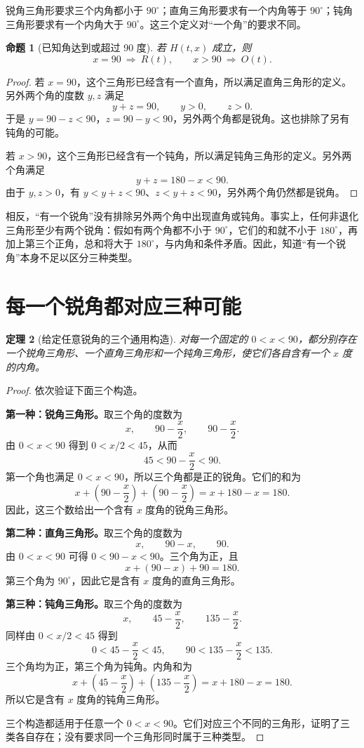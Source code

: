 \documentclass[UTF8,a4paper,zihao=-4,oneside,openany,fontset=fandol]{ctexbook}
\newtheorem{theorem}{定理}[chapter]
\newtheorem{proposition}[theorem]{命题}
\theoremstyle{definition}
\theoremstyle{remark}
\begin{document}
锐角三角形要求三个内角都小于 $90^\circ$；直角三角形要求有一个内角等于 $90^\circ$；钝角三角形要求有一个内角大于 $90^\circ$。这三个定义对“一个角”的要求不同。

\begin{proposition}[已知角达到或超过 90 度]
\label{prop:any-angle-large}
若 $H(t,x)$ 成立，则
\[
x=90\ \Longrightarrow\ R(t),
\qquad
x>90\ \Longrightarrow\ O(t).
\]
\end{proposition}

\begin{proof}
若 $x=90$，这个三角形已经含有一个直角，所以满足直角三角形的定义。另外两个角的度数 $y,z$ 满足
\[
y+z=90,\qquad y>0,\qquad z>0.
\]
于是 $y=90-z<90$，$z=90-y<90$，另外两个角都是锐角。这也排除了另有钝角的可能。

若 $x>90$，这个三角形已经含有一个钝角，所以满足钝角三角形的定义。另外两个角满足
\[
y+z=180-x<90.
\]
由于 $y,z>0$，有 $y<y+z<90$、$z<y+z<90$，另外两个角仍然都是锐角。
\end{proof}

相反，“有一个锐角”没有排除另外两个角中出现直角或钝角。事实上，任何非退化三角形至少有两个锐角：假如有两个角都不小于 $90^\circ$，它们的和就不小于 $180^\circ$，再加上第三个正角，总和将大于 $180^\circ$，与内角和条件矛盾。因此，知道“有一个锐角”本身不足以区分三种类型。

\section{每一个锐角都对应三种可能}

\begin{theorem}[给定任意锐角的三个通用构造]
\label{thm:any-acute-three-types}
对每一个固定的 $0<x<90$，都分别存在一个锐角三角形、一个直角三角形和一个钝角三角形，使它们各自含有一个 $x$ 度的内角。
\end{theorem}

\begin{proof}
依次验证下面三个构造。

\textbf{第一种：锐角三角形。}取三个角的度数为
\[
x,\qquad 90-\frac x2,\qquad 90-\frac x2.
\]
由 $0<x<90$ 得到 $0<x/2<45$，从而
\[
45<90-\frac x2<90.
\]
第一个角也满足 $0<x<90$，所以三个角都是正的锐角。它们的和为
\[
x+\left(90-\frac x2\right)+\left(90-\frac x2\right)
=x+180-x=180.
\]
因此，这三个数给出一个含有 $x$ 度角的锐角三角形。

\textbf{第二种：直角三角形。}取三个角的度数为
\[
x,\qquad 90-x,\qquad 90.
\]
由 $0<x<90$ 可得 $0<90-x<90$。三个角为正，且
\[
x+(90-x)+90=180.
\]
第三个角为 $90^\circ$，因此它是含有 $x$ 度角的直角三角形。

\textbf{第三种：钝角三角形。}取三个角的度数为
\[
x,\qquad 45-\frac x2,\qquad 135-\frac x2.
\]
同样由 $0<x/2<45$ 得到
\[
0<45-\frac x2<45,
\qquad
90<135-\frac x2<135.
\]
三个角均为正，第三个角为钝角。内角和为
\[
x+\left(45-\frac x2\right)+\left(135-\frac x2\right)
=x+180-x=180.
\]
所以它是含有 $x$ 度角的钝角三角形。

三个构造都适用于任意一个 $0<x<90$。它们对应三个不同的三角形，证明了三类各自存在；没有要求同一个三角形同时属于三种类型。
\end{proof}
\end{document}
